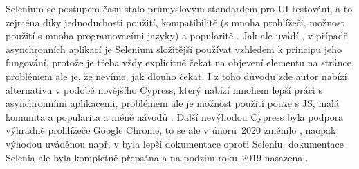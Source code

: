 Selenium se postupem času stalo průmyslovým standardem pro UI testování, a to zejména díky jednoduchosti použití, kompatibilitě (s mnoha prohlížeči, možnost použití s mnoha programovacími jazyky) a popularitě \cite{test-selenium1}. Jak ale uvádí \cite{test-cypress1}, v případě asynchronních aplikací je Selenium složitější používat vzhledem k principu jeho fungování, protože je třeba vždy explicitně čekat na objevení elementu na stránce, problémem ale je, že nevíme, jak dlouho čekat. I z toho důvodu zde autor nabízí alternativu v podobě novějšího \href{https://www.cypress.io/}{Cypress}, který nabízí mnohem lepší práci s asynchronními aplikacemi, problémem ale je možnost použití pouze s JS, malá komunita a popularita a méně návodů \cite{test-cypress1}. Další nevýhodou Cypress byla podpora výhradně prohlížeče Google Chrome, to se ale v únoru~2020 změnilo \cite{test-cypress2}, naopak výhodou uváděnou např. v \cite{test-cypress3} byla lepší dokumentace oproti Seleniu, dokumentace Selenia ale byla kompletně přepsána a na podzim roku~2019 nasazena \cite{test-selenium2}.

